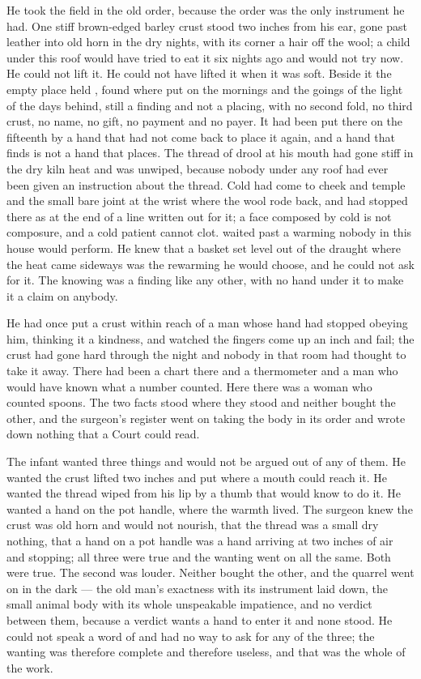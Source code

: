 He took the field in the old order, because the order was the only instrument he had. One stiff brown-edged barley crust stood two inches from his ear, gone past leather into old horn in the dry nights, with its corner a hair off the wool; a child under this roof would have tried to eat it six nights ago and would not try now. He could not lift it. He could not have lifted it when it was soft. Beside it the empty place held , found where put on the mornings and the goings of the light of the days behind, still a finding and not a placing, with no second fold, no third crust, no name, no gift, no payment and no payer. It had been put there on the fifteenth by a hand that had not come back to place it again, and a hand that finds is not a hand that places. The thread of drool at his mouth had gone stiff in the dry kiln heat and was unwiped, because nobody under any roof had ever been given an instruction about the thread. Cold had come to cheek and temple and the small bare joint at the wrist where the wool rode back, and had stopped there as at the end of a line written out for it; a face composed by cold is not composure, and a cold patient cannot clot.  waited past a warming nobody in this house would perform. He knew that a basket set level out of the draught where the heat came sideways was the rewarming he would choose, and he could not ask for it. The knowing was a finding like any other, with no hand under it to make it a claim on anybody.

He had once put a crust within reach of a man whose hand had stopped obeying him, thinking it a kindness, and watched the fingers come up an inch and fail; the crust had gone hard through the night and nobody in that room had thought to take it away. There had been a chart there and a thermometer and a man who would have known what a number counted. Here there was a woman who counted spoons. The two facts stood where they stood and neither bought the other, and the surgeon's register went on taking the body in its order and wrote down nothing that a Court could read.

The infant wanted three things and would not be argued out of any of them. He wanted the crust lifted two inches and put where a mouth could reach it. He wanted the thread wiped from his lip by a thumb that would know to do it. He wanted a hand on the pot handle, where the warmth lived. The surgeon knew the crust was old horn and would not nourish, that the thread was a small dry nothing, that a hand on a pot handle was a hand arriving at two inches of air and stopping; all three were true and the wanting went on all the same. Both were true. The second was louder. Neither bought the other, and the quarrel went on in the dark --- the old man's exactness with its instrument laid down, the small animal body with its whole unspeakable impatience, and no verdict between them, because a verdict wants a hand to enter it and none stood. He could not speak a word of  and had no way to ask for any of the three; the wanting was therefore complete and therefore useless, and that was the whole of the work.

